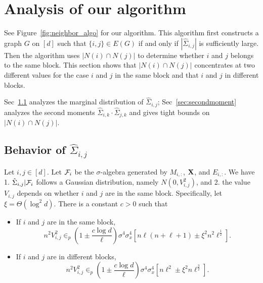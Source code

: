 \section{Analysis of our algorithm}\label{sec:analysis}
See Figure~\ref{fig:neighbor_algo} for our algorithm. This algorithm first constructs a graph $G$ on $[d]$ such that $\{i, j\} \in E(G)$ if and only if $|\hat \Sigma_{i,j}|$ is sufficiently large. Then the algorithm uses $|N(i) \cap N(j)|$ to determine whether $i$ and $j$ belongs to the same block. This section shows that $|N(i)\cap N(j)|$ concentrates at two different values for the case $i$ and $j$ in the same block and that $i$ and $j$ in different blocks. 

Sec~\ref{sec:firstmoment} analyzes the marginal distribution of $\hat \Sigma_{i, j}$; Sec~\ref{sec:secondmoment} analyzes 
the second moments $\hat \Sigma_{i, k} \cdot \hat \Sigma_{j, k}$ and gives tight bounds on $|N(i) \cap N(j)|$.

\subsection{Behavior of $\hat \Sigma_{i,j}$}\label{sec:firstmoment}

\begin{lemma}\label{lem:boundSigma} Let $i, j \in [d]$. Let $\mathcal{F}_i$ be the $\sigma$-algebra generated by $M_{i, :}$, $\mathbf{X}$, and $E_{i,:}$.
We have 1. $\hat \Sigma_{i,j} | \mathcal{F}_i$ follows a Gaussian distribution, namely $N(0, V^2_{i,j})$, and 2. the value $V_{i,j}$ depends on whether $i$ and $j$ are in the same block. Specifically, let $\xi = \Theta(\log^2 d)$. There is a constant $c > 0$ such that
     
     \begin{itemize}
        \item If $i$ and $j$ are in the same block,  
            \begin{equation}
                n^2V^2_{i,j} \in_p (1\pm \frac{c\log d}{\ell})\sigma^4\sigma^4_x[n\ell(n + \ell +1) \pm \xi^2 n^2 \ell^{\frac{1}{2}}]. 
            \end{equation}
        \item If $i$ and $j$ are in different blocks, 
        \begin{equation}
             n^2V^2_{i,j} 
            \in_{p} (1 \pm \frac{c\log d}{\ell}) \sigma^4\sigma^4_x [n \ell^2 \pm \xi^2 n \ell^{\frac{3}{2}}].
         \end{equation}

    \end{itemize}
\end{lemma}

